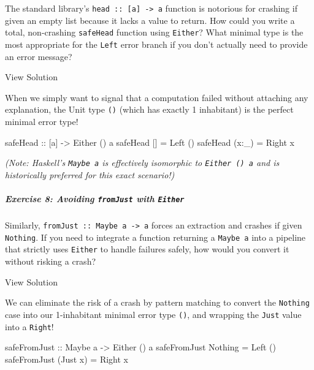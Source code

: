 \documentclass[
]{article}
\newenvironment{Shaded}{}{}
\newcommand{\DataTypeTok}[1]{\textcolor[rgb]{0.56,0.13,0.00}{#1}}
\newcommand{\NormalTok}[1]{#1}
\newcommand{\OperatorTok}[1]{\textcolor[rgb]{0.40,0.40,0.40}{#1}}
\newcommand{\OtherTok}[1]{\textcolor[rgb]{0.00,0.44,0.13}{#1}}
\begin{document}
The standard library's \texttt{head\ ::\ {[}a{]}\ -\textgreater{}\ a}
function is notorious for crashing if given an empty list because it
lacks a value to return. How could you write a total, non-crashing
\texttt{safeHead} function using \texttt{Either}? What minimal type is
the most appropriate for the \texttt{Left} error branch if you don't
actually need to provide an error message?

View Solution

When we simply want to signal that a computation failed without
attaching any explanation, the Unit type \texttt{()} (which has exactly
1 inhabitant) is the perfect minimal error type!

\begin{Shaded}
\begin{Highlighting}[]
\OtherTok{safeHead ::}\NormalTok{ [a] }\OtherTok{{-}\textgreater{}} \DataTypeTok{Either}\NormalTok{ () a}
\NormalTok{safeHead []    }\OtherTok{=} \DataTypeTok{Left}\NormalTok{ ()}
\NormalTok{safeHead (x}\OperatorTok{:}\NormalTok{\_) }\OtherTok{=} \DataTypeTok{Right}\NormalTok{ x}
\end{Highlighting}
\end{Shaded}

\emph{(Note: Haskell's \texttt{Maybe\ a} is effectively isomorphic to
\texttt{Either\ ()\ a} and is historically preferred for this exact
scenario!)}

\subparagraph{\texorpdfstring{Exercise 8: Avoiding \texttt{fromJust}
with
\texttt{Either}}{Exercise 8: Avoiding fromJust with Either}}\label{exercise-8-avoiding-fromjust-with-either}

Similarly, \texttt{fromJust\ ::\ Maybe\ a\ -\textgreater{}\ a} forces an
extraction and crashes if given \texttt{Nothing}. If you need to
integrate a function returning a \texttt{Maybe\ a} into a pipeline that
strictly uses \texttt{Either} to handle failures safely, how would you
convert it without risking a crash?

View Solution

We can eliminate the risk of a crash by pattern matching to convert the
\texttt{Nothing} case into our 1-inhabitant minimal error type
\texttt{()}, and wrapping the \texttt{Just} value into a \texttt{Right}!

\begin{Shaded}
\begin{Highlighting}[]
\OtherTok{safeFromJust ::} \DataTypeTok{Maybe}\NormalTok{ a }\OtherTok{{-}\textgreater{}} \DataTypeTok{Either}\NormalTok{ () a}
\NormalTok{safeFromJust }\DataTypeTok{Nothing}  \OtherTok{=} \DataTypeTok{Left}\NormalTok{ ()}
\NormalTok{safeFromJust (}\DataTypeTok{Just}\NormalTok{ x) }\OtherTok{=} \DataTypeTok{Right}\NormalTok{ x}
\end{Highlighting}
\end{Shaded}
\end{document}
